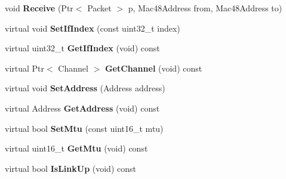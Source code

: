 \begin{DoxyCompactItemize}
\item 
\hypertarget{classns3_1_1PLC__NetDevice_a8819c37779adc3bfac770a29369081bf}{void {\bfseries \-Receive} (\-Ptr$<$ \-Packet $>$ p, \-Mac48\-Address from, \-Mac48\-Address to)}\label{classns3_1_1PLC__NetDevice_a8819c37779adc3bfac770a29369081bf}

\item 
\hypertarget{classns3_1_1PLC__NetDevice_ad53fdd96eca2e68e86c677647d645b3d}{virtual void {\bfseries \-Set\-If\-Index} (const uint32\-\_\-t index)}\label{classns3_1_1PLC__NetDevice_ad53fdd96eca2e68e86c677647d645b3d}

\item 
\hypertarget{classns3_1_1PLC__NetDevice_a48b82babf1b68b0e2e4bb5ae4da25fb7}{virtual uint32\-\_\-t {\bfseries \-Get\-If\-Index} (void) const }\label{classns3_1_1PLC__NetDevice_a48b82babf1b68b0e2e4bb5ae4da25fb7}

\item 
\hypertarget{classns3_1_1PLC__NetDevice_a2efb94ed1cdabe913b15c073ce0da98b}{virtual \-Ptr$<$ \-Channel $>$ {\bfseries \-Get\-Channel} (void) const }\label{classns3_1_1PLC__NetDevice_a2efb94ed1cdabe913b15c073ce0da98b}

\item 
\hypertarget{classns3_1_1PLC__NetDevice_ab974a8f68f55330be7600fa78ca3bbb3}{virtual void {\bfseries \-Set\-Address} (\-Address address)}\label{classns3_1_1PLC__NetDevice_ab974a8f68f55330be7600fa78ca3bbb3}

\item 
\hypertarget{classns3_1_1PLC__NetDevice_a78f3d7797df80c2a683981ccad2c7dc5}{virtual \-Address {\bfseries \-Get\-Address} (void) const }\label{classns3_1_1PLC__NetDevice_a78f3d7797df80c2a683981ccad2c7dc5}

\item 
\hypertarget{classns3_1_1PLC__NetDevice_a492f4dfa85a3a4a1a80a54220c41c493}{virtual bool {\bfseries \-Set\-Mtu} (const uint16\-\_\-t mtu)}\label{classns3_1_1PLC__NetDevice_a492f4dfa85a3a4a1a80a54220c41c493}

\item 
\hypertarget{classns3_1_1PLC__NetDevice_afbde7c16392320bfa5d6eef133064ad2}{virtual uint16\-\_\-t {\bfseries \-Get\-Mtu} (void) const }\label{classns3_1_1PLC__NetDevice_afbde7c16392320bfa5d6eef133064ad2}

\item 
\hypertarget{classns3_1_1PLC__NetDevice_adcb78aebb74e738fd01acb1157f02d6f}{virtual bool {\bfseries \-Is\-Link\-Up} (void) const }\label{classns3_1_1PLC__NetDevice_adcb78aebb74e738fd01acb1157f02d6f}


\end{DoxyCompactItemize}
